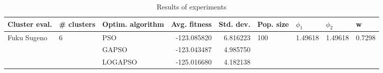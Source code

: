 \begin{table}
\centering
\caption{Results of experiments}
\begin{tabular}{lllrrllll}
\toprule
               Cluster eval. &        \# clusters & Optim. algorithm &  Avg. fitness &  Std. dev. &            Pop. size &               $\phi_{1}$ &               $\phi_{2}$ &                       w \\
\midrule
\multirow{3}{*}{Fuku Sugeno} & \multirow{3}{*}{6} &              PSO &   -123.085820 &   6.816223 & \multirow{3}{*}{100} & \multirow{3}{*}{1.49618} & \multirow{3}{*}{1.49618} & \multirow{3}{*}{0.7298} \\
                             &                    &            GAPSO &   -123.043487 &   4.985750 &                      &                          &                          &                         \\
                             &                    &          LOGAPSO &   -125.016680 &   4.182138 &                      &                          &                          &                         \\
\bottomrule
\end{tabular}
\end{table}
